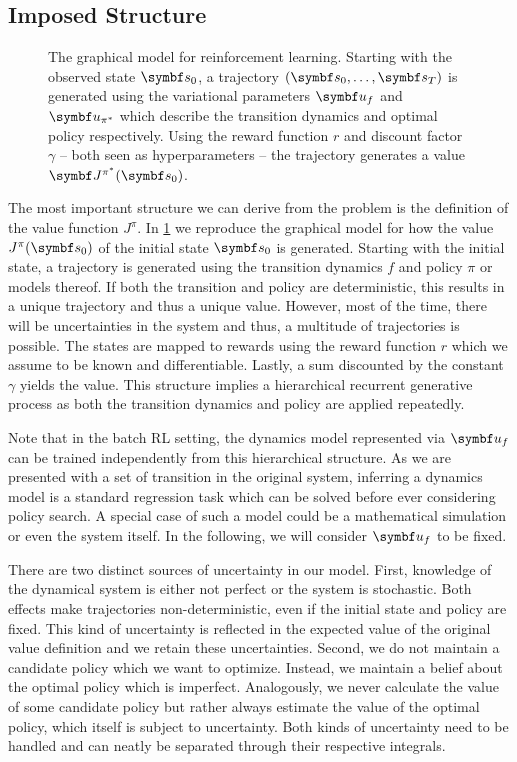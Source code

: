 \subsection{Imposed Structure}
\begin{figure}[t]
    \centering
    
    \caption{
        \label{fig:graphical_model}
        The graphical model for reinforcement learning.
        Starting with the observed state $\mat{s}_0$, a trajectory $\left( \mat{s}_0, \dots, \mat{s}_T \right)$ is generated using the variational parameters $\mat{u}_f$ and $\mat{u}_{\pi^\ast}$ which describe the transition dynamics and optimal policy respectively.
        Using the reward function $r$ and discount factor $\gamma$ -- both seen as hyperparameters -- the trajectory generates a value $\mat{J}^{\pi^\ast}(\mat{s}_0)$.
    }
\end{figure}
The most important structure we can derive from the problem is the definition of the value function $J^\pi$.
In \cref{fig:graphical_model} we reproduce the graphical model for how the value $J^\pi(\mat{s}_0)$ of the initial state $\mat{s}_0$ is generated.
Starting with the initial state, a trajectory is generated using the transition dynamics $f$ and policy $\pi$ or models thereof.
If both the transition and policy are deterministic, this results in a unique trajectory and thus a unique value.
However, most of the time, there will be uncertainties in the system and thus, a multitude of trajectories is possible.
The states are mapped to rewards using the reward function $r$ which we assume to be known and differentiable.
Lastly, a sum discounted by the constant $\gamma$ yields the value.
This structure implies a hierarchical recurrent generative process as both the transition dynamics and policy are applied repeatedly.

Note that in the batch RL setting, the dynamics model represented via $\mat{u}_f$ can be trained independently from this hierarchical structure.
As we are presented with a set of transition in the original system, inferring a dynamics model is a standard regression task which can be solved before ever considering policy search.
A special case of such a model could be a mathematical simulation or even the system itself.
In the following, we will consider $\mat{u}_f$ to be fixed.

There are two distinct sources of uncertainty in our model.
First, knowledge of the dynamical system is either not perfect or the system is stochastic.
Both effects make trajectories non-deterministic, even if the initial state and policy are fixed.
This kind of uncertainty is reflected in the expected value of the original value definition and we retain these uncertainties.
Second, we do not maintain a candidate policy which we want to optimize.
Instead, we maintain a belief about the optimal policy which is imperfect.
Analogously, we never calculate the value of some candidate policy but rather always estimate the value of the optimal policy, which itself is subject to uncertainty.
Both kinds of uncertainty need to be handled and can neatly be separated through their respective integrals.


